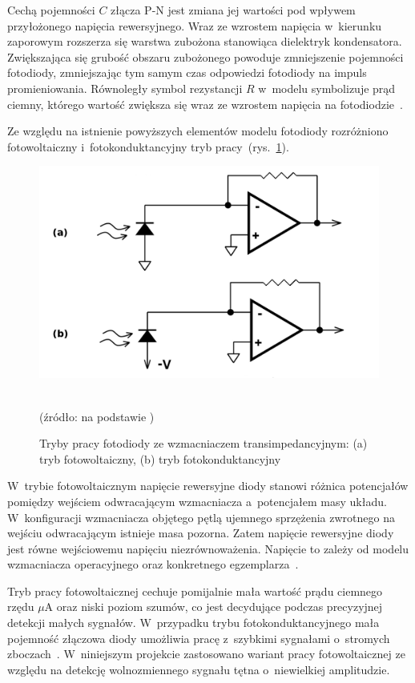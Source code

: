 Cechą pojemności $C$ złącza P-N jest zmiana jej wartości pod wpływem przyłożonego napięcia rewersyjnego. Wraz ze wzrostem napięcia w~kierunku zaporowym rozszerza się warstwa zubożona stanowiąca dielektryk
kondensatora. Zwiększająca się grubość obszaru zubożonego powoduje zmniejszenie pojemności fotodiody, zmniejszając tym samym czas odpowiedzi fotodiody na impuls promieniowania. Równoległy symbol 
rezystancji $R$ w~modelu symbolizuje prąd ciemny, którego wartość zwiększa się wraz ze wzrostem napięcia na fotodiodzie~\cite{Rako}. 

Ze względu na istnienie powyższych elementów modelu fotodiody rozróżniono fotowoltaiczny i~fotokonduktancyjny tryb pracy~(rys.~\ref{rys:photocond}).
\begin{figure}[ht]
	\centerline{\includegraphics[scale = 0.2]{graphic/photocond}}
	\caption{Tryby pracy fotodiody ze wzmacniaczem transimpedancyjnym: (a) tryb fotowoltaiczny, (b) tryb fotokonduktancyjny}
	~\\
	(źródło: na podstawie \cite{Rako})
	\label{rys:photocond}
\end{figure}

\noindent W~trybie fotowoltaicznym napięcie rewersyjne diody stanowi różnica potencjałów pomiędzy wejściem odwracającym wzmacniacza a~potencjałem masy układu. W~konfiguracji wzmacniacza objętego pętlą ujemnego 
sprzężenia zwrotnego na wejściu odwracającym istnieje masa pozorna. Zatem napięcie rewersyjne diody jest równe wejściowemu napięciu niezrównoważenia. Napięcie to zależy od modelu wzmacniacza operacyjnego 
oraz konkretnego egzemplarza~\cite{Gorecki:2004}.

\noindent Tryb pracy fotowoltaicznej cechuje pomijalnie mała wartość prądu ciemnego rzędu $\mu$A oraz niski poziom szumów, co jest decydujące podczas precyzyjnej detekcji małych sygnałów. W~przypadku trybu fotokonduktancyjnego 
mała pojemność złączowa diody umożliwia pracę z~szybkimi sygnałami o~stromych zboczach~\cite{Rako}. 
W~niniejszym projekcie zastosowano wariant pracy fotowoltaicznej ze względu na detekcję wolnozmiennego sygnału tętna o~niewielkiej amplitudzie.


